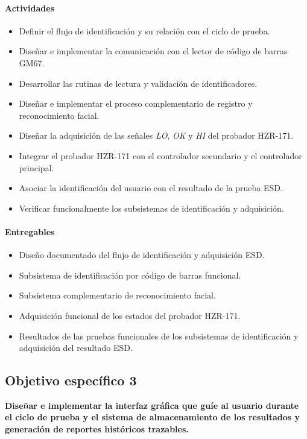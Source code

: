 \paragraph{Actividades}

\begin{itemize}
\item Definir el flujo de identificación y su relación con el ciclo de prueba.
\item Diseñar e implementar la comunicación con el lector de código de barras
GM67.
\item Desarrollar las rutinas de lectura y validación de identificadores.
\item Diseñar e implementar el proceso complementario de registro y
reconocimiento facial.
\item Diseñar la adquisición de las señales \textit{LO}, \textit{OK} y
\textit{HI} del probador HZR-171.
\item Integrar el probador HZR-171 con el controlador secundario y el
controlador principal.
\item Asociar la identificación del usuario con el resultado de la prueba ESD.
\item Verificar funcionalmente los subsistemas de identificación y adquisición.
\end{itemize}

\paragraph{Entregables}

\begin{itemize}
\item Diseño documentado del flujo de identificación y adquisición ESD.
\item Subsistema de identificación por código de barras funcional.
\item Subsistema complementario de reconocimiento facial.
\item Adquisición funcional de los estados del probador HZR-171.
\item Resultados de las pruebas funcionales de los subsistemas de identificación
y adquisición del resultado ESD.
\end{itemize}

\subsection{Objetivo específico 3}

\textbf{Diseñar e implementar la interfaz gráfica que guíe al usuario durante
el ciclo de prueba y el sistema de almacenamiento de los resultados y
generación de reportes históricos trazables.}

